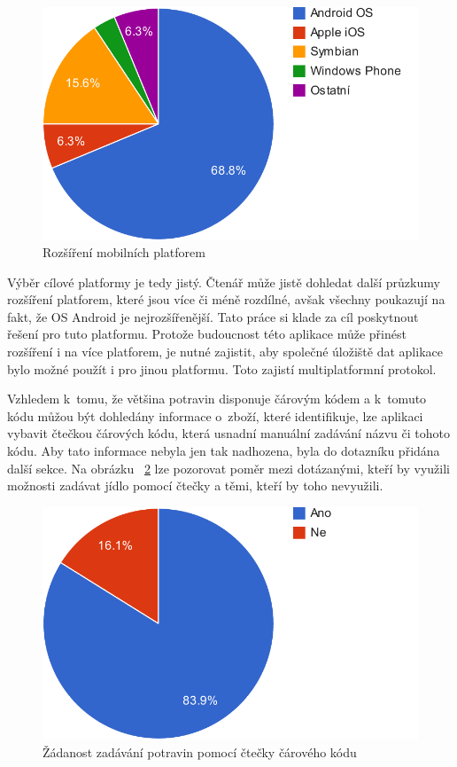\documentclass[thesis=B,czech]{FITthesis}[2013/10/20]
\begin{document}
\begin{figure}[H]
  \centering
  \includegraphics[scale=0.8]{charts/survey_os}
  \caption{Rozšíření mobilních platforem}
  \label{fig:SurveyOS}
\end{figure}

Výběr cílové platformy je tedy jistý. Čtenář může jistě dohledat další průzkumy rozšíření platforem, které jsou více či méně rozdílné, avšak všechny poukazují na fakt, že OS Android je nejrozšířenější. Tato práce si klade za cíl poskytnout řešení pro tuto platformu. Protože budoucnost této aplikace může přinést rozšíření i na více platforem, je nutné zajistit, aby společné úložiště dat aplikace bylo možné použít i pro jinou platformu. Toto zajistí multiplatformní protokol.

Vzhledem k~tomu, že většina potravin disponuje čárovým kódem a k~tomuto kódu můžou být dohledány informace o~zboží, které identifikuje, lze aplikaci vybavit čtečkou čárových kódu, která usnadní manuální zadávání názvu či tohoto kódu. Aby tato informace nebyla jen tak nadhozena, byla do dotazníku přidána další sekce. Na obrázku ~\ref{fig:SurveyScan} lze pozorovat poměr mezi dotázanými, kteří by využili možnosti zadávat jídlo pomocí čtečky a těmi, kteří by toho nevyužili.

\begin{figure}[H]
  \centering
  \includegraphics[scale=0.8]{charts/survey_scan}
  \caption{Žádanost zadávání potravin pomocí čtečky čárového kódu}
  \label{fig:SurveyScan}
\end{figure}
\end{document}
